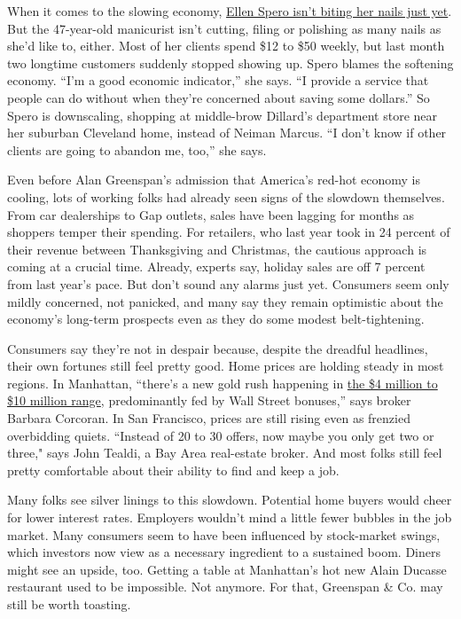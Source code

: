 When it comes to the slowing economy, \uline{Ellen Spero isn't biting her nails
just yet}. But the 47-year-old manicurist isn't cutting, filing or
polishing as many nails as she'd like to, either. Most of her clients
spend \$12 to \$50 weekly, but last month two longtime customers
suddenly stopped showing up. Spero blames the softening economy. ``I'm a
good economic indicator,'' she says. ``I provide a service that people
can do without when they're concerned about saving some dollars.'' So
Spero is downscaling, shopping at middle-brow Dillard's department store
near her suburban Cleveland home, instead of Neiman Marcus. ``I don't
know if other clients are going to abandon me, too,'' she says.

Even before Alan Greenspan's admission that America's red-hot economy is
cooling, lots of working folks had already seen signs of the slowdown
themselves. From car dealerships to Gap outlets, sales have been lagging
for months as shoppers temper their spending. For retailers, who last
year took in 24 percent of their revenue between Thanksgiving and
Christmas, the cautious approach is coming at a crucial time. Already,
experts say, holiday sales are off 7 percent from last year's pace. But
don't sound any alarms just yet. Consumers seem only mildly concerned,
not panicked, and many say they remain optimistic about the economy's
long-term prospects even as they do some modest belt-tightening.

Consumers say they're not in despair because, despite the dreadful
headlines, their own fortunes still feel pretty good. Home prices are
holding steady in most regions. In Manhattan, ``there's a new gold rush
happening in \uline{the \$4 million to \$10 million range}, predominantly fed by
Wall Street bonuses,'' says broker Barbara Corcoran. In San Francisco,
prices are still rising even as frenzied overbidding quiets. ``Instead
of 20 to 30 offers, now maybe you only get two or three," says John
Tealdi, a Bay Area real-estate broker. And most folks still feel pretty
comfortable about their ability to find and keep a job.

Many folks see silver linings to this slowdown. Potential home buyers
would cheer for lower interest rates. Employers wouldn't mind a little
fewer bubbles in the job market. Many consumers seem to have been
influenced by stock-market swings, which investors now view as a
necessary ingredient to a sustained boom. Diners might see an upside,
too. Getting a table at Manhattan's hot new Alain Ducasse restaurant
used to be impossible. Not anymore. For that, Greenspan \& Co. may still
be worth toasting.

